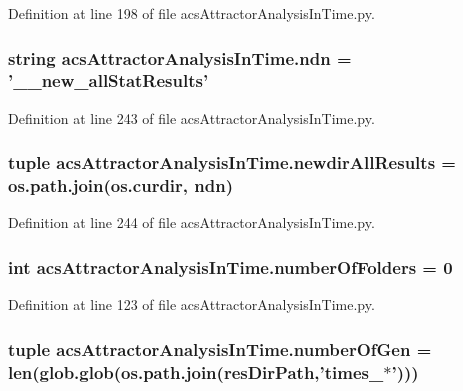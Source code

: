 Definition at line 198 of file acs\+Attractor\+Analysis\+In\+Time.\+py.

\hypertarget{a00125_ab0e0a55161ee1fd9fb0f086a328f67b7}{
\subsubsection[{ndn}]{\setlength{\rightskip}{0pt plus 5cm}string acs\+Attractor\+Analysis\+In\+Time.\+ndn = '\+\_\+\_\+new\+\_\+all\+Stat\+Results'}}\label{a00125_ab0e0a55161ee1fd9fb0f086a328f67b7}


Definition at line 243 of file acs\+Attractor\+Analysis\+In\+Time.\+py.

\hypertarget{a00125_aaf0f6fcbaaf97dcff16b62e86df0209c}{
\subsubsection[{newdir\+All\+Results}]{\setlength{\rightskip}{0pt plus 5cm}tuple acs\+Attractor\+Analysis\+In\+Time.\+newdir\+All\+Results = os.\+path.\+join(os.\+curdir, {\bf ndn})}}\label{a00125_aaf0f6fcbaaf97dcff16b62e86df0209c}


Definition at line 244 of file acs\+Attractor\+Analysis\+In\+Time.\+py.

\hypertarget{a00125_a3a2fe097086bb0f4a505fca8f53dc2b0}{
\subsubsection[{number\+Of\+Folders}]{\setlength{\rightskip}{0pt plus 5cm}int acs\+Attractor\+Analysis\+In\+Time.\+number\+Of\+Folders = 0}}\label{a00125_a3a2fe097086bb0f4a505fca8f53dc2b0}


Definition at line 123 of file acs\+Attractor\+Analysis\+In\+Time.\+py.

\hypertarget{a00125_a28cc280ff54c726bd790cf781d3bab8c}{
\subsubsection[{number\+Of\+Gen}]{\setlength{\rightskip}{0pt plus 5cm}tuple acs\+Attractor\+Analysis\+In\+Time.\+number\+Of\+Gen = len(glob.\+glob(os.\+path.\+join({\bf res\+Dir\+Path},'times\+\_\+$\ast$')))}}\label{a00125_a28cc280ff54c726bd790cf781d3bab8c}


